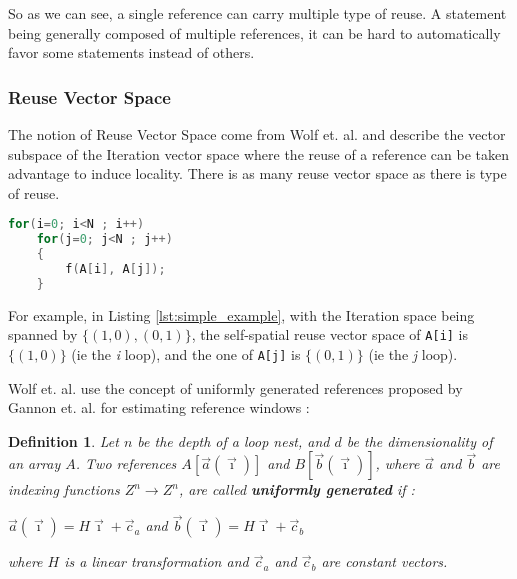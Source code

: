 \documentclass[paper=a4, fontsize=11.5pt]{scrartcl}
\newtheorem{defn}{Definition}[section]
\numberwithin{equation}{section}        %
\numberwithin{figure}{section}          %
\numberwithin{table}{section}               %
\begin{document}
                So as we can see, a single reference can carry multiple type of reuse.
                A statement being generally composed of multiple references, it 
                can be hard to automatically favor some statements instead of others.
        \subsubsection{Reuse Vector Space}
        \label{sec:wolf_91}
            The notion of Reuse Vector Space come from Wolf et. al.\cite{Wolf'91} and describe
            the vector subspace of the Iteration vector space where the reuse of
            a reference can be taken advantage to induce locality.
            There is as many reuse vector space as there is type of reuse.

\begin{lstlisting}[frame=single, language=C, caption=Simple example, label={lst:simple_example}]
for(i=0; i<N ; i++)
    for(j=0; j<N ; j++)
    {
        f(A[i], A[j]);
    }
\end{lstlisting}

            For example, in Listing \ref{lst:simple_example}, with the Iteration
            space being spanned by $\{(1,0),(0,1)\}$, the self-spatial reuse vector space of
            \verb'A[i]' is $\{(1,0)\}$ (ie the {\it i} loop), and the one of \verb'A[j]' is $\{(0,1)\}$
            (ie the {\it j} loop).

            Wolf et. al. use the concept of uniformly generated references proposed
            by Gannon et. al.\cite{Gannon:1988:SCL:50454.50460} for estimating reference
            windows :
            \begin{defn}
            \label{sec:uniformly_generated}
                Let $n$ be the depth of a loop nest, and $d$ be the dimensionality of
                an array $A$. Two references $A[\vec{a}(\vec{\imath})]$ and
                $B[\vec{b}(\vec{\imath})]$, where $\vec{a}$ and $\vec{b}$ are indexing
                functions $Z^{n} \rightarrow Z^{n}$, are called \textbf{uniformly generated} if :
                \begin{center}
                    $\vec{a}(\vec{\imath}) = H\vec{\imath}+\vec{c}_a$ and $\vec{b}(\vec{\imath}) = H\vec{\imath}+\vec{c}_b$
                \end{center}
                where $H$ is a linear transformation and $\vec{c}_a$ and $\vec{c}_b$ are constant vectors.
            \end{defn}
            
\end{document}
